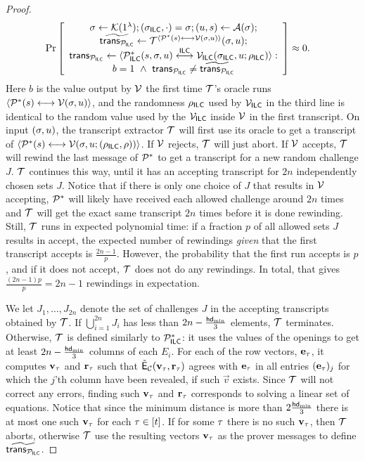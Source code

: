 \begin{proof}
\begin{align}\Pr&\left[\begin{array}{c} \mathsf{\sigma}\gets \mathcal{K}(1^{\lambda});(\mathsf{\sigma}_{\mathsf{ILC}},\cdot)=\mathsf{\sigma};(u,s) \gets \mathcal{A}(\mathsf{\sigma});\\
\widetilde{\mathsf{trans}_{\mathcal{P}_{\mathsf{ILC}}}} \gets \mathcal{T}^{\langle \mathcal{P}^*(s)\longleftrightarrow\mathcal{V}(\mathsf{\sigma},u)\rangle}(\mathsf{\sigma},u);\\
\mathsf{trans}_{\mathcal{P}_{\mathsf{ILC}}} \gets \langle \mathcal{P}_{\mathsf{ILC}}^*(s,\mathsf{\sigma},u)\overset{\mathsf{ILC}}{\longleftrightarrow}\mathcal{V}_{\mathsf{ILC}}(\mathsf{\sigma}_{\mathsf{ILC}},u;\rho_{\mathsf{ILC}})\rangle:\\
b=1~~\wedge~~\mathsf{trans}_{\mathcal{P}_{\mathsf{ILC}}} \neq \widetilde{\mathsf{trans}_{\mathcal{P}_{\mathsf{ILC}}}}
\end{array}
\right]\approx 0.\label{zkip:ineq:mal}
\end{align}
Here $b$ is the value output by $\mathcal{V}$ the first time $\mathcal{T}$'s oracle runs $\langle \mathcal{P}^*(s)\longleftrightarrow\mathcal{V}(\mathsf{\sigma},u)\rangle$, and the randomness $\rho_{\mathsf{ILC}}$ used by $\mathcal{V}_{\mathsf{ILC}}$ in the third line is identical to the random value used by the $\mathcal{V}_{\mathsf{ILC}}$ inside $\mathcal{V}$ in the first transcript. 
On input $(\mathsf{\sigma},u)$, the transcript extractor $\mathcal{T}$ will first use its oracle to get a transcript of $ \langle \mathcal{P}^*(s)\longleftrightarrow\mathcal{V}(\mathsf{\sigma},u;(\rho_{\mathsf{ILC}},\rho))\rangle$.  
If $\mathcal{V}$ rejects, $\mathcal{T}$ will just abort. If $\mathcal{V}$ accepts, $\mathcal{T}$ will rewind the last message of $\mathcal{P}^*$ to get a transcript for a new random challenge $J$. $\mathcal{T}$ continues this way, until it has an accepting transcript for $2n$ independently chosen sets $J$. Notice that if there is only one choice of $J$ that results in $\mathcal{V}$ accepting, $\mathcal{P}^*$ will likely have received  each allowed challenge around $2n$ times and $\mathcal{T}$ will get the exact same transcript $2n$ times before it is done rewinding. Still, 
$\mathcal{T}$ runs in expected polynomial time: if a fraction $p$ of all allowed sets $J$ results in accept, the expected number of rewindings \emph{given} that the first transcript accepts is $\frac{2n-1}{p}$. However, the probability that the first run accepts is $p$, and if it does not accept, $\mathcal{T}$ does not do any rewindings. In total, that gives $\frac{(2n-1)p}{p}=2n-1$ rewindings in expectation. 

We let $J_1,\dots, J_{2n}$ denote the set of challenges $J$ in the accepting transcripts obtained by $\mathcal{T}$. If  $\bigcup_{i=1}^{2n} J_i$ has less than $2n-\frac{\mathsf{hd}_{\mathrm{min}}}{3}$ elements, $\mathcal{T}$ terminates. Otherwise, $\mathcal{T}$ is defined similarly to $\mathcal{P}_{\mathsf{ILC}}^*$: it uses the values of the openings to get at least $2n-\frac{\mathsf{hd}_{\mathrm{min}}}{3}$ columns of each $E_i$. For each of the row vectors, $\mathbf{e}_\tau$, it computes $\mathbf{v}_\tau$ and $\mathbf{r}_\tau$ such that $\tilde{\mathsf{E}}_{\mathcal{C}}(\mathbf{v}_\tau,\mathbf{r}_\tau)$ agrees with $\mathbf{e}_\tau$ in all entries $(\mathbf{e}_\tau)_j$ for which the $j$'th column have been revealed, if such $\vec{v}$ exists. Since $\mathcal{T}$ will not correct any errors, finding such $\mathbf{v}_\tau$ and $\mathbf{r}_\tau$ corresponds to solving a linear set of equations. Notice that since the minimum distance is more than $2\frac{\mathsf{hd}_{\mathrm{min}}}{3}$ there is at most one such $\mathbf{v}_\tau$ for each $\tau\in [t]$.  If for some $\tau$ there is no such $\mathbf{v}_{\tau}$, then $\mathcal{T}$ aborts, otherwise $\mathcal{T}$ use the resulting vectors $\mathbf{v}_\tau$ as the prover messages to define $\widetilde{\mathsf{trans}_{\mathcal{P}_{\mathsf{ILC}}}}$.


\end{proof}

